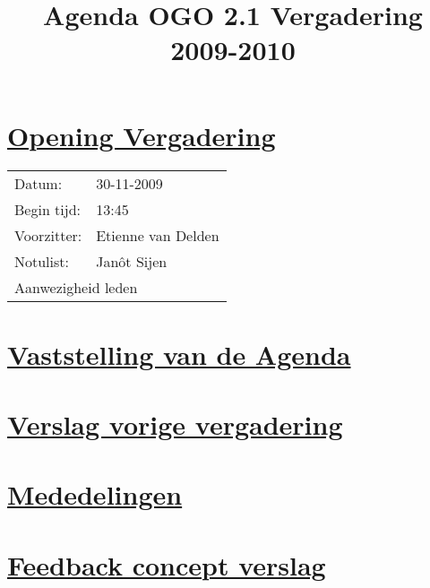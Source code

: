 \documentclass[a4paper]{article}
\title{Agenda OGO 2.1 Vergadering 2009-2010}
\date{}
\begin{document}
\ifpdf
{}
\else
{}
\fi

\maketitle

\section{\underline{Opening Vergadering}} %
\label{sec:opening_vergadering}
\begin{tabular}{ll}
  Datum:      & 30-11-2009\\
  Begin tijd: & 13:45\\
  Voorzitter: & Etienne van Delden\\
  Notulist:   & Jan\^ot Sijen\\
  \multicolumn{2}{l}{Aanwezigheid leden}
\end{tabular}



\section{\underline{Vaststelling van de Agenda}} %
\label{sec:vaststelling_van_de_agenda}


\section{\underline{Verslag vorige vergadering}} %
\label{sec:bespreking_van_de_vorige_notulen}


\section{\underline{Mededelingen}} %
\label{sec:mededelingen}

\section{\underline{Feedback concept verslag}} %
\label{sec:feedback concept verslag}

\end{document}
